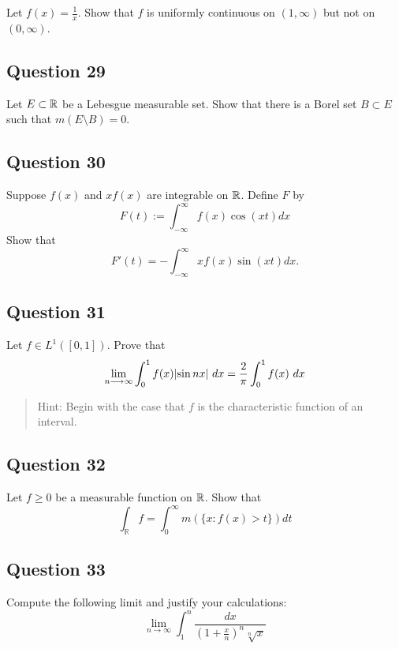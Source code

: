 \documentclass[12pt]{article}
\begin{document}
Let \(f(x) = \frac 1 x\). Show that \(f\) is uniformly continuous on
\((1, \infty)\) but not on \((0,\infty)\).

\hypertarget{question-29-1}{%
\subsection{Question 29}\label{question-29-1}}

Let \(E\subset {\mathbb{R}}\) be a Lebesgue measurable set. Show that there is a
Borel set \(B \subset E\) such that \(m(E\setminus B) = 0\).

\hypertarget{question-30-1}{%
\subsection{Question 30}\label{question-30-1}}

Suppose \(f(x)\) and \(xf(x)\) are integrable on \({\mathbb{R}}\). Define \(F\)
by \[
F(t):=\int_{-\infty}^{\infty} f(x) \cos (x t) d x
\] Show that \[
F'(t)=-\int_{-\infty}^{\infty} x f(x) \sin (x t) d x.
\]

\hypertarget{question-31-1}{%
\subsection{Question 31}\label{question-31-1}}

Let \(f\in L^1([0, 1])\). Prove that \[
\lim_{n \longrightarrow \infty} \int_{0}^{1} f(x) {\left\lvert {\sin n x} \right\rvert} ~d x= \frac{2}{\pi} \int_{0}^{1} f(x) ~d x
\]

\begin{quote}
Hint: Begin with the case that \(f\) is the characteristic function of
an interval.
\end{quote}

\hypertarget{question-32-1}{%
\subsection{Question 32}\label{question-32-1}}

Let \(f \geq 0\) be a measurable function on \({\mathbb{R}}\). Show that \[
\int_{\mathbb{R}} f=\int_{0}^{\infty} m(\{x: f(x)>t\}) d t
\]

\hypertarget{question-33-1}{%
\subsection{Question 33}\label{question-33-1}}

Compute the following limit and justify your calculations: \[
\lim_{n \rightarrow \infty} \int_{1}^{n} \frac{d x}{\left(1+\frac{x}{n}\right)^{n} \sqrt[n]{x}}
\]
\end{document}

